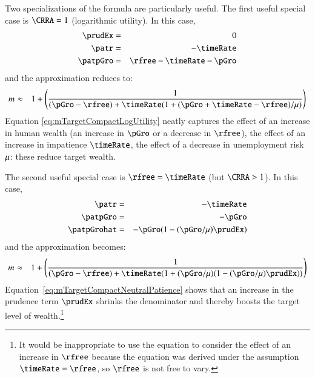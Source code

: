 Two specializations of the formula are particularly useful.  The first useful special case is $\CRRA = 1$ (logarithmic utility).  In this case,
\begin{eqnarray*}
  \prudEx & = & 0
\\  \patr & = & -\timeRate
\\  \patpGro & = & \rfree-\timeRate-\pGro
\end{eqnarray*}
and the approximation reduces to:
\begin{eqnarray}
 \mTarg^{\null} & \approx & 1 + \left(\frac{1}{(\pGro-\rfree)+\timeRate(1+(\pGro+\timeRate-\rfree)/\urate)}\right)
\label{eq:mTargetCompactLogUtility}
\end{eqnarray}
Equation \eqref{eq:mTargetCompactLogUtility} neatly captures the effect of an increase in human wealth (an increase in $\pGro$ or a decrease in $\rfree$), the effect of an increase in impatience $\timeRate$, 
the effect of a decrease in unemployment risk $\mu$: these reduce target wealth.


The second useful special case is $\rfree = \timeRate$ (but $\CRRA>1$).  In this case,
\begin{eqnarray*}
    \patr & = & -\timeRate
\\  \patpGro & = & -\pGro
\\  \patpGrohat & = & -\pGro (1-(\pGro/\urate)\prudEx)
\end{eqnarray*}
and the approximation becomes:
\begin{eqnarray}
 \mTarg^{\null} & \approx & 1 + \left(\frac{1}{(\pGro-\rfree)+\timeRate(1+(\pGro/\urate)(1-(\pGro/\urate)\prudEx))}\right)
 \label{eq:mTargetCompactNeutralPatience}
\end{eqnarray}
Equation~\eqref{eq:mTargetCompactNeutralPatience} shows that an increase in the prudence term $\prudEx$
shrinks the denominator and thereby boosts the target level of
wealth.\footnote{It would be inappropriate to use the equation to
  consider the effect of an increase in $\rfree$ because the equation was derived under the
  assumption $\timeRate=\rfree$, so $\rfree$ is not free to vary.}
